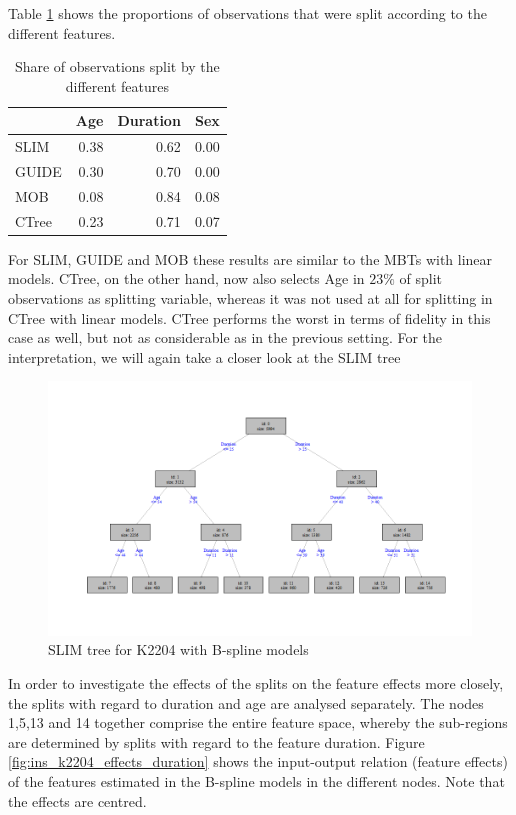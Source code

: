 Table \ref{tab:ins_k2204_bsplines_small_surrogates_share}  shows the proportions of observations that were split according to the different features. 


\begin{table}[!htb]
\caption{Share of observations split by the different features}
\centering
\begin{tabular}[t]{l|r|r|r}
\hline
  & Age & Duration & Sex\\
\hline
SLIM & 0.38 & 0.62 & 0.00\\
GUIDE & 0.30 & 0.70 & 0.00\\
MOB & 0.08 & 0.84 & 0.08\\
CTree & 0.23 & 0.71 & 0.07\\
\hline
\end{tabular}
\label{tab:ins_k2204_bsplines_small_surrogates_share}
\end{table}

For SLIM, GUIDE and MOB these results are similar to the MBTs with linear models. CTree, on the other hand, now also selects Age in $23\%$ of split observations as splitting variable, whereas it was not used at all for splitting in CTree with linear models. CTree performs the worst in terms of fidelity in this case as well, but not as considerable as in the previous setting.
For the interpretation, we will again take a closer look at the SLIM tree

\begin{figure}[!htb]
    \centering   
    \includegraphics[width = 16cm]{Figures/insurance_use_case/k2204_BPV/slim_bsplines_small_tree.png}
         \caption{SLIM tree for K2204 with B-spline models}
     \label{fig:ins_slim_bsplines_tree}
\end{figure}

In order to investigate the effects of the splits on the feature effects more closely, the splits with regard to duration and age are analysed separately.
The nodes 1,5,13 and 14 together comprise the entire feature space, whereby the sub-regions are determined by splits with regard to the feature duration.
Figure \ref{fig:ins_k2204_effects_duration} shows the input-output relation (feature effects) of the features estimated in the B-spline models in the different nodes. Note that the effects are centred.

